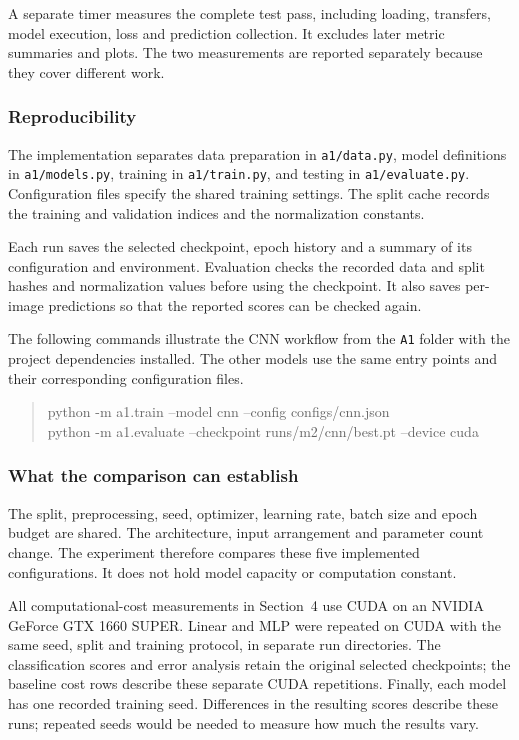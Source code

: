 A separate timer measures the complete test pass, including loading, transfers,
model execution, loss and prediction collection. It excludes later metric
summaries and plots. The two measurements are reported separately because they
cover different work.

\subsubsection{Reproducibility}
The implementation separates data preparation in \texttt{a1/data.py}, model
definitions in \texttt{a1/models.py}, training in \texttt{a1/train.py}, and testing
in \texttt{a1/evaluate.py}. Configuration files specify the shared training
settings. The split cache records the training and validation indices and the
normalization constants.

Each run saves the selected checkpoint, epoch history and a summary of its
configuration and environment. Evaluation checks the recorded data and split
hashes and normalization values before using the checkpoint. It also saves
per-image predictions so that the reported scores can be checked again.

The following commands illustrate the CNN workflow from the \texttt{A1} folder
with the project dependencies installed. The other models use the same entry
points and their corresponding configuration files.
\begin{quote}\small\ttfamily
python -m a1.train --model cnn --config configs/cnn.json\\
python -m a1.evaluate --checkpoint runs/m2/cnn/best.pt --device cuda
\end{quote}

\subsubsection{What the comparison can establish}
The split, preprocessing, seed, optimizer, learning rate, batch size and epoch
budget are shared. The architecture, input arrangement and parameter count
change. The experiment therefore compares these five implemented configurations.
It does not hold model capacity or computation constant.

All computational-cost measurements in Section~4 use CUDA on
an NVIDIA GeForce GTX 1660 SUPER. Linear and MLP were repeated on CUDA with
the same seed, split and training protocol, in separate run directories.
The classification scores and error analysis retain the original selected
checkpoints; the baseline cost rows describe these separate CUDA repetitions.
Finally, each model has one recorded
training seed. Differences in the resulting scores describe these runs; repeated
seeds would be needed to measure how much the results vary.



